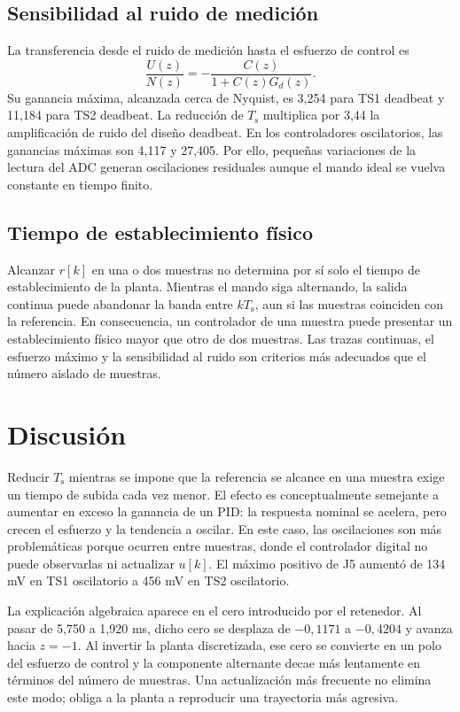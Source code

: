 \documentclass[10pt,twocolumn]{article}
\newcommand{\Ts}{T_{\mathrm{s}}}
\begin{document}
\clearpage

\subsection{Sensibilidad al ruido de medición}
La transferencia desde el ruido de medición hasta el esfuerzo de control es
\begin{equation}
\frac{U(z)}{N(z)}=-\frac{C(z)}{1+C(z)G_d(z)}.
\end{equation}
Su ganancia máxima, alcanzada cerca de Nyquist, es 3,254 para TS1 deadbeat y 11,184 para TS2 deadbeat. La reducción de \(\Ts\) multiplica por 3,44 la amplificación de ruido del diseño deadbeat. En los controladores oscilatorios, las ganancias máximas son 4,117 y 27,405. Por ello, pequeñas variaciones de la lectura del ADC generan oscilaciones residuales aunque el mando ideal se vuelva constante en tiempo finito.

\subsection{Tiempo de establecimiento físico}
Alcanzar \(r[k]\) en una o dos muestras no determina por sí solo el tiempo de establecimiento de la planta. Mientras el mando siga alternando, la salida continua puede abandonar la banda entre \(k\Ts\), aun si las muestras coinciden con la referencia. En consecuencia, un controlador de una muestra puede presentar un establecimiento físico mayor que otro de dos muestras. Las trazas continuas, el esfuerzo máximo y la sensibilidad al ruido son criterios más adecuados que el número aislado de muestras.

\section{Discusión}
Reducir \(\Ts\) mientras se impone que la referencia se alcance en una muestra exige un tiempo de subida cada vez menor. El efecto es conceptualmente semejante a aumentar en exceso la ganancia de un PID: la respuesta nominal se acelera, pero crecen el esfuerzo y la tendencia a oscilar. En este caso, las oscilaciones son más problemáticas porque ocurren entre muestras, donde el controlador digital no puede observarlas ni actualizar \(u[k]\). El máximo positivo de J5 aumentó de 134 mV en TS1 oscilatorio a 456 mV en TS2 oscilatorio.

La explicación algebraica aparece en el cero introducido por el retenedor. Al pasar de 5,750 a 1,920 ms, dicho cero se desplaza de \(-0,1171\) a \(-0,4204\) y avanza hacia \(z=-1\). Al invertir la planta discretizada, ese cero se convierte en un polo del esfuerzo de control y la componente alternante decae más lentamente en términos del número de muestras. Una actualización más frecuente no elimina este modo; obliga a la planta a reproducir una trayectoria más agresiva.
\end{document}
